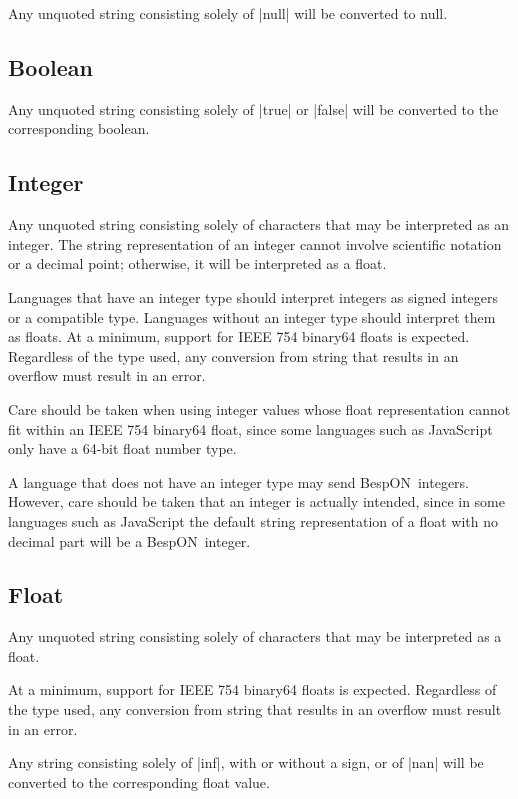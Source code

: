 \documentclass[11pt]{article}
\newcommand{\bespon}{BespON}
\begin{document}
Any unquoted string consisting solely of |null| will be converted to null.


\subsection{Boolean}

Any unquoted string consisting solely of |true| or |false| will be converted to the corresponding boolean.


\subsection{Integer}

Any unquoted string consisting solely of characters that may be interpreted as an integer.  The string representation of an integer cannot involve scientific notation or a decimal point; otherwise, it will be interpreted as a float.

Languages that have an integer type should interpret integers as signed integers or a compatible type.  Languages without an integer type should interpret them as floats.  At a minimum, support for IEEE 754 binary64 floats is expected.  Regardless of the type used, any conversion from string that results in an overflow must result in an error.

Care should be taken when using integer values whose float representation cannot fit within an IEEE 754 binary64 float, since some languages such as JavaScript only have a 64-bit float number type.

A language that does not have an integer type may send \bespon\ integers.  However, care should be taken that an integer is actually intended, since in some languages such as JavaScript the default string representation of a float with no decimal part will be a \bespon\ integer.


\subsection{Float}

Any unquoted string consisting solely of characters that may be interpreted as a float.  

At a minimum, support for IEEE 754 binary64 floats is expected.  Regardless of the type used, any conversion from string that results in an overflow must result in an error.

Any string consisting solely of |inf|, with or without a sign, or of |nan| will be converted to the corresponding float value.
\end{document}
